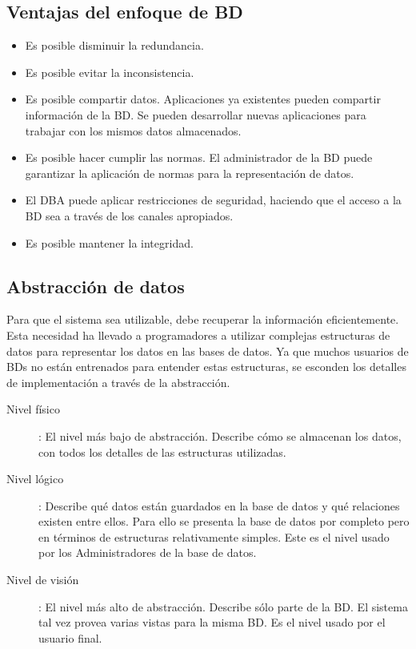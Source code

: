 \documentclass[a4paper]{article}
\begin{document}
\subsection{Ventajas del enfoque de BD}
\begin{itemize}
    \item Es posible disminuir la redundancia.
    \item Es posible evitar la inconsistencia.
    \item Es posible compartir datos. Aplicaciones ya existentes pueden compartir información
    de la BD. Se pueden desarrollar nuevas aplicaciones para trabajar con los mismos datos
    almacenados.
    \item Es posible hacer cumplir las normas. El administrador de la BD puede garantizar la
    aplicación de normas para la representación de datos.
    \item El DBA puede aplicar restricciones de seguridad, haciendo que el acceso a la BD sea
    a través de los canales apropiados.
    \item Es posible mantener la integridad.
\end{itemize}

\subsection{Abstracción de datos}
Para que el sistema sea utilizable, debe recuperar la información eficientemente. Esta necesidad
ha llevado a programadores a utilizar complejas estructuras de datos para representar los datos en
las bases de datos. Ya que muchos usuarios de BDs no están entrenados para entender estas
estructuras, se esconden los detalles de implementación a través de la abstracción.
\begin{description}
    \item[Nivel físico]: El nivel más bajo de abstracción. Describe cómo se almacenan los datos,
    con todos los detalles de las estructuras utilizadas.
    \item[Nivel lógico]: Describe qué datos están guardados en la base de datos y qué relaciones
    existen entre ellos. Para ello se presenta la base de datos por completo pero en términos de
    estructuras relativamente simples. Este es el nivel usado por los Administradores de la base
    de datos.
    \item[Nivel de visión]: El nivel más alto de abstracción. Describe sólo parte de la BD. El
    sistema tal vez provea varias vistas para la misma BD. Es el nivel usado por el usuario final.
\end{description}
\end{document}
